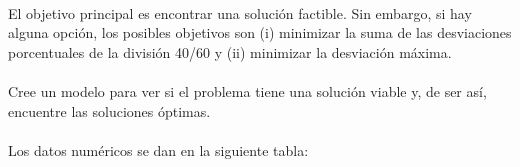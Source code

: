 \paragraph{} El objetivo principal es encontrar una solución factible. Sin embargo, si hay alguna opción, los posibles objetivos son (i) minimizar la suma de las desviaciones porcentuales de la división 40/60 y (ii) minimizar la desviación máxima.
\paragraph{} Cree un modelo para ver si el problema tiene una solución viable y, de ser así, encuentre las soluciones óptimas.
\paragraph{} Los datos numéricos se dan en la siguiente tabla:

